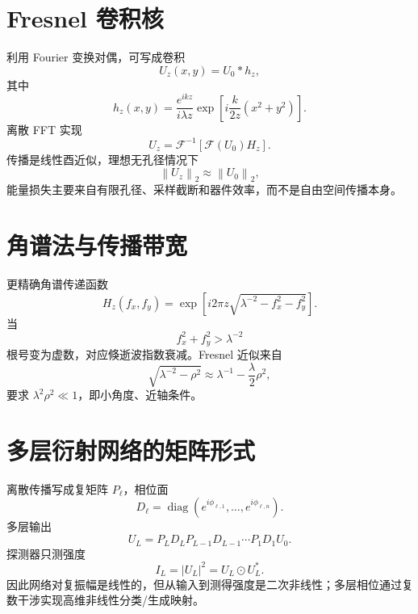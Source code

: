 \documentclass[UTF8,12pt,a4paper,fontset=none]{ctexart}
\numberwithin{equation}{section}
\newcommand{\norm}[1]{\left\lVert #1\right\rVert}
\newcommand{\diag}{\operatorname{diag}}
\begin{document}
\section{Fresnel 卷积核}
利用 Fourier 变换对偶，可写成卷积
\begin{equation}
 U_z(x,y)=U_0*h_z,
\end{equation}
其中
\begin{equation}
 h_z(x,y)=\frac{e^{ikz}}{i\lambda z}
 \exp\left[i\frac{k}{2z}(x^2+y^2)
\right].
\end{equation}
离散 FFT 实现
\begin{equation}
 U_z=\mathcal F^{-1}\left[
 \mathcal F(U_0)H_z
 \right].
\end{equation}
传播是线性酉近似，理想无孔径情况下
\begin{equation}
 \norm{U_z}_2\approx\norm{U_0}_2,
\end{equation}
能量损失主要来自有限孔径、采样截断和器件效率，而不是自由空间传播本身。

\section{角谱法与传播带宽}
更精确角谱传递函数
\begin{equation}
 H_z(f_x,f_y)=
 \exp\left[i2\pi z
 \sqrt{\lambda^{-2}-f_x^2-f_y^2}\right].
\end{equation}
当
\begin{equation}
 f_x^2+f_y^2>\lambda^{-2}
\end{equation}
根号变为虚数，对应倏逝波指数衰减。Fresnel 近似来自
\begin{equation}
 \sqrt{\lambda^{-2}-\rho^2}
 \approx\lambda^{-1}-\frac\lambda2\rho^2,
\end{equation}
要求 $\lambda^2\rho^2\ll1$，即小角度、近轴条件。

\section{多层衍射网络的矩阵形式}
离散传播写成复矩阵 $P_\ell$，相位面
\begin{equation}
 D_\ell=\diag(e^{i\phi_{\ell,1}},\ldots,e^{i\phi_{\ell,n}}).
\end{equation}
多层输出
\begin{equation}
 U_L=P_LD_LP_{L-1}D_{L-1}\cdots P_1D_1U_0.
\end{equation}
探测器只测强度
\begin{equation}
 I_L=|U_L|^2=U_L\odot U_L^*.
\end{equation}
因此网络对复振幅是线性的，但从输入到测得强度是二次非线性；多层相位通过复数干涉实现高维非线性分类/生成映射。
\end{document}
